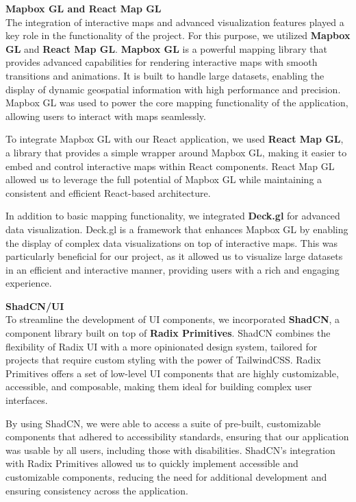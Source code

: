 \textbf{Mapbox GL and React Map GL} \\
The integration of interactive maps and advanced visualization features
played a key role in the functionality of the project. For this purpose, we
utilized \textbf{Mapbox GL} and \textbf{React Map GL}. \textbf{Mapbox GL} is
a powerful mapping library that provides advanced capabilities for rendering
interactive maps with smooth transitions and animations. It is built to
handle large datasets, enabling the display of dynamic geospatial
information with high performance and precision. Mapbox GL was used to power
the core mapping functionality of the application, allowing users to
interact with maps seamlessly.

To integrate Mapbox GL with our React application, we used \textbf{React Map
GL}, a library that provides a simple wrapper around Mapbox GL, making it
easier to embed and control interactive maps within React components. React
Map GL allowed us to leverage the full potential of Mapbox GL while
maintaining a consistent and efficient React{-}based architecture.

In addition to basic mapping functionality, we integrated \textbf{Deck.gl}
for advanced data visualization. Deck.gl is a framework that enhances Mapbox
GL by enabling the display of complex data visualizations on top of
interactive maps. This was particularly beneficial for our project, as it
allowed us to visualize large datasets in an efficient and interactive
manner, providing users with a rich and engaging experience.

\newpage{}

\textbf{ShadCN/UI} \\
To streamline the development of UI components, we incorporated
\textbf{ShadCN}, a component library built on top of \textbf{Radix
Primitives}. ShadCN combines the flexibility of Radix UI with a more
opinionated design system, tailored for projects that require custom styling
with the power of TailwindCSS\@. Radix Primitives offers a set of
low{-}level UI components that are highly customizable, accessible, and
composable, making them ideal for building complex user interfaces.

By using ShadCN, we were able to access a suite of pre{-}built, customizable
components that adhered to accessibility standards, ensuring that our
application was usable by all users, including those with disabilities.
ShadCN's integration with Radix Primitives allowed us to quickly implement
accessible and customizable components, reducing the need for additional
development and ensuring consistency across the application.

